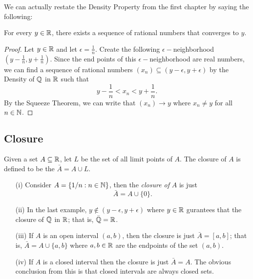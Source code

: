 We can actually restate the Density Property from the first chapter by saying the following:

\begin{theorem}{}{}
For every \( y \in \mathbb{R}  \), there exists a sequence of rational numbers that converges to \( y \). 
\end{theorem}

\begin{proof}
    Let \( y \in \mathbb{R}  \) and let \( \epsilon = \frac{ 1 }{ n }  \). Create the following \( \epsilon- \)neighborhood \( (y-\frac{ 1 }{ n }, y + \frac{ 1 }{ n } ) \). Since the end points of this \( \epsilon- \)neighborhood are real numbers, we can find a sequence of rational numbers \( (x_n) \subseteq (y - \epsilon , y + \epsilon  )\) by the Density of \( \mathbb{Q} \) in \( \mathbb{R} \) such that 
    \[ y - \frac{ 1 }{ n } < x_n < y + \frac{ 1 }{ n }. \]
    By the Squeeze Theorem, we can write that \( (x_n) \to y \) where \( x_n \neq y \) for all \( n \in \mathbb{N}  \). 
\end{proof}

\subsection{Closure}

\begin{definition}{}{}
    Given a set \( A \subseteq \mathbb{R}  \), let \( L \) be the set of all limit points of \( A \). The closure of \( A \) is defined to be the \( \bar{A} = A \cup L \). 
\end{definition}

\begin{example}{}{}
\begin{enumerate}
    \item[(i)] Consider \( A = \{ 1/n : n \in \mathbb{N}  \}  \), then the \textit{closure of} \( A \) is 
    just 
    \[ \bar{A} = A \cup \{ 0 \}. \]
\item[(ii)] In the last example, \( y \notin (y- \epsilon , y + \epsilon ) \) where \( y \in \mathbb{R}  \) gurantees that the closure of \( \mathbb{Q}  \) in \( \mathbb{R}  \); that is, \( \bar{\mathbb{Q}} = \mathbb{R}  \). 
\item[(iii)] If \( A \) is an open interval \( (a,b) \), then the closure is just \( \bar{A} = [a,b] \); that is, \( \bar{A} = A \cup \{ a,b \}  \) where \( a,b \in \mathbb{R}  \) are the endpoints of the set \( (a,b) \). 
\item[(iv)]If \( A \) is a closed interval then the closure is just \( \bar{A} = A  \). The obvious conclusion from this is that closed intervals are always closed sets. 
\end{enumerate}
\end{example}

